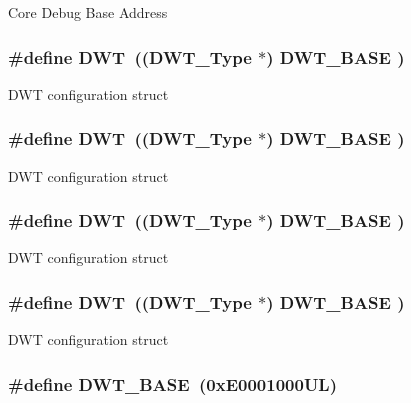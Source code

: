 Core Debug Base Address \hypertarget{group___c_m_s_i_s__core__base_gabbe5a060185e1d5afa3f85b14e10a6ce}{
\subsubsection[{D\-W\-T}]{\setlength{\rightskip}{0pt plus 5cm}\#define D\-W\-T~(({\bf D\-W\-T\-\_\-\-Type}       $\ast$)     {\bf D\-W\-T\-\_\-\-B\-A\-S\-E}      )}}\label{group___c_m_s_i_s__core__base_gabbe5a060185e1d5afa3f85b14e10a6ce}
D\-W\-T configuration struct \hypertarget{group___c_m_s_i_s__core__base_gabbe5a060185e1d5afa3f85b14e10a6ce}{
\subsubsection[{D\-W\-T}]{\setlength{\rightskip}{0pt plus 5cm}\#define D\-W\-T~(({\bf D\-W\-T\-\_\-\-Type}       $\ast$)     {\bf D\-W\-T\-\_\-\-B\-A\-S\-E}      )}}\label{group___c_m_s_i_s__core__base_gabbe5a060185e1d5afa3f85b14e10a6ce}
D\-W\-T configuration struct \hypertarget{group___c_m_s_i_s__core__base_gabbe5a060185e1d5afa3f85b14e10a6ce}{
\subsubsection[{D\-W\-T}]{\setlength{\rightskip}{0pt plus 5cm}\#define D\-W\-T~(({\bf D\-W\-T\-\_\-\-Type}       $\ast$)     {\bf D\-W\-T\-\_\-\-B\-A\-S\-E}      )}}\label{group___c_m_s_i_s__core__base_gabbe5a060185e1d5afa3f85b14e10a6ce}
D\-W\-T configuration struct \hypertarget{group___c_m_s_i_s__core__base_gabbe5a060185e1d5afa3f85b14e10a6ce}{
\subsubsection[{D\-W\-T}]{\setlength{\rightskip}{0pt plus 5cm}\#define D\-W\-T~(({\bf D\-W\-T\-\_\-\-Type}       $\ast$)     {\bf D\-W\-T\-\_\-\-B\-A\-S\-E}      )}}\label{group___c_m_s_i_s__core__base_gabbe5a060185e1d5afa3f85b14e10a6ce}
D\-W\-T configuration struct \hypertarget{group___c_m_s_i_s__core__base_gafdab534f961bf8935eb456cb7700dcd2}{
\subsubsection[{D\-W\-T\-\_\-\-B\-A\-S\-E}]{\setlength{\rightskip}{0pt plus 5cm}\#define D\-W\-T\-\_\-\-B\-A\-S\-E~(0x\-E0001000\-U\-L)}}\label{group___c_m_s_i_s__core__base_gafdab534f961bf8935eb456cb7700dcd2}

